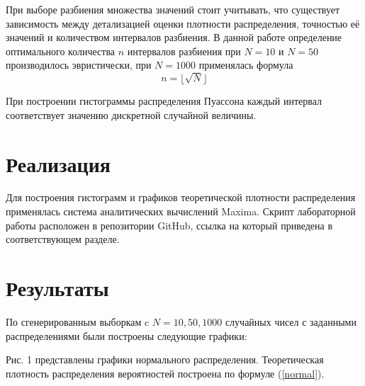 \documentclass[12pt]{article}
\newcommand{\lskip}{\hfill\break}
\begin{document}
\begin{flushleft}
        При выборе разбиения множества значений стоит учитывать, что существует зависимость между детализацией оценки плотности распределения, точностью её значений и количеством интервалов разбиения. В данной работе определение оптимального количества $n$ интервалов разбиения при $N = 10$ и $N = 50$ производилось эвристически, при $N = 1000$ применялась формула
        \begin{equation}
            n = \lfloor \sqrt{N} \rfloor
        \end{equation}

        При построении гистограммы распределения Пуассона каждый интервал соответствует значению дискретной случайной величины.

\newpage

\section{Реализация}

    Для построения гистограмм и графиков теоретической плотности распределения применялась система аналитических вычислений Maxima. Скрипт лабораторной работы расположен в репозитории GitHub, ссылка на который приведена в соответствующем разделе.

\newpage

\section{Результаты}

    По сгенерированным выборкам c $N = 10, 50, 1000$ случайных чисел с заданными распределениями были построены следующие графики:
    \lskip

     Рис. 1 представлены графики нормального распределения. Теоретическая плотность распределения вероятностей построена по формуле (\ref{normal}).


\end{flushleft}
\end{document}
